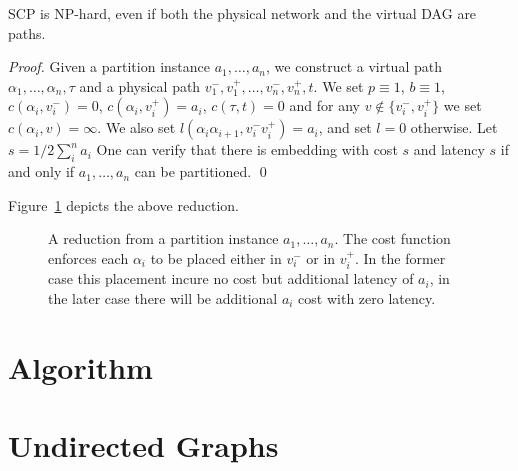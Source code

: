\documentclass[runningheads]{llncs}
\newcommand{\scp}{\textsc{SCP}\xspace}
\begin{document}
\begin{theorem}
\scp is NP-hard, even if both the physical network and the virtual DAG
are paths.
\end{theorem}
\begin{proof}
 
Given a partition instance $a_1, \ldots, a_n$, we construct a virtual path
$\alpha_1, \ldots, \alpha_n, \tau$ and a physical path 
$v_1^-, v_1^+, \ldots, v_n^-, v_n^+, t$.
We set $p \equiv 1$, $b \equiv 1$, 
$c(\alpha_i, v_i^-) = 0$, $c(\alpha_i, v_i^+) = a_i$, $c(\tau, t) = 0$
and for any $v \notin \{v_i^-,v_i^+\}$ we set $c(\alpha_i, v) = \infty$.
We also set $l(\alpha_i\alpha_{i+1}, v_i^-v_i^+) = a_i$, and set $l = 0$
otherwise.
Let $s = 1/2\sum_i^n a_i$
One can verify that there is embedding with cost $s$ and latency $s$ 
if and only if $a_1, \ldots, a_n$ can be partitioned.
\qed
\end{proof}
Figure~\ref{fig:reduction2} depicts the above reduction.
\begin{figure}[ht]
\centering
\scalebox{.9}{

}
\caption[]{
\label{fig:reduction2}
A reduction from a partition instance $a_1, \ldots, a_n$.
The cost function enforces each $\alpha_i$ to be placed either 
in $v_i^-$ or in $v_i^+$.
In the former case this placement incure no cost but additional latency of $a_i$,
in the later case there will be additional $a_i$ cost with zero latency.
}
\end{figure}



\section{Algorithm}




\section{Undirected Graphs}




\end{document}
